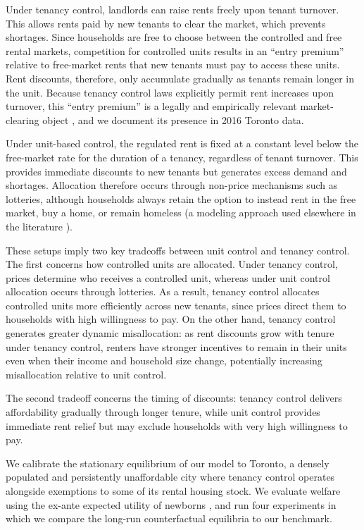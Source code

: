 \documentclass[parskip=full]{article}
\begin{document}
Under tenancy control, landlords can raise rents freely upon tenant turnover. This allows rents paid by new tenants to clear the market, which prevents shortages. Since households are free to choose between the controlled and free rental markets, competition for controlled units results in an ``entry premium'' relative to free-market rents that new tenants must pay to access these units. Rent discounts, therefore, only accumulate gradually as tenants remain longer in the unit. Because tenancy control laws explicitly permit rent increases upon turnover, this ``entry premium'' is a legally and empirically relevant market-clearing object \citep{arnott-1995}, and we document its presence in 2016 Toronto data.

Under unit-based control, the regulated rent is fixed at a constant level below the free-market rate for the duration of a tenancy, regardless of tenant turnover. This provides immediate discounts to new tenants but generates excess demand and shortages. Allocation therefore occurs through non-price mechanisms such as lotteries, although households always retain the option to instead rent in the free market, buy a home, or remain homeless (a modeling approach used elsewhere in the literature \citep{fmn-2023}). 

These setups imply two key tradeoffs between unit control and tenancy control. The first concerns how controlled units are allocated. Under tenancy control, prices determine who receives a controlled unit, whereas under unit control allocation occurs through lotteries. As a result, tenancy control allocates controlled units more efficiently across new tenants, since prices direct them to households with high willingness to pay. On the other hand, tenancy control generates greater dynamic misallocation: as rent discounts grow with tenure under tenancy control, renters have stronger incentives to remain in their units even when their income and household size change, potentially increasing misallocation relative to unit control.

The second tradeoff concerns the timing of discounts: tenancy control delivers affordability gradually through longer tenure, while unit control provides immediate rent relief but may exclude households with very high willingness to pay.

We calibrate the stationary equilibrium of our model to Toronto, a densely populated and persistently unaffordable city where tenancy control operates alongside exemptions to some of its rental housing stock. We evaluate welfare using the ex-ante expected utility of newborns \citep{rawls-1971,conesa-et-al,gkkoc}, and run four experiments in which we compare the long-run counterfactual equilibria to our benchmark. 
\end{document}
